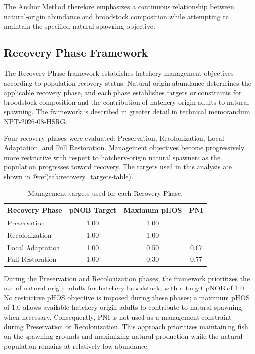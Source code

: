\documentclass[12pt,letterpaper]{article}
\begin{document}
The Anchor Method therefore emphasizes a continuous relationship between
natural-origin abundance and broodstock composition while attempting to
maintain the specified natural-spawning objective.

\subsection{Recovery Phase Framework}\label{recovery-phase-framework}

The Recovery Phase framework establishes hatchery management objectives
according to population recovery status. Natural-origin abundance determines
the applicable recovery phase, and each phase establishes targets or
constraints for broodstock composition and the contribution of hatchery-origin
adults to natural spawning. The framework is described in greater detail in
technical memorandum NPT-2026-08-HSRG.

Four recovery phases were evaluated: Preservation, Recolonization, Local
Adaptation, and Full Restoration. Management objectives become progressively
more restrictive with respect to hatchery-origin natural spawners as the
population progresses toward recovery. The targets used in this analysis are shown in @ref(tab:recovery\_targets-table).

\begin{table}

\caption{\label{tab:recovery-targets-table}Management targets used for each Recovery Phase.}
\centering
\begin{tabular}[t]{l|c|c|c}
\hline
Recovery Phase & pNOB Target & Maximum pHOS & PNI\\
\hline
Preservation & 1.00 & 1.00 & --\\
\hline
Recolonization & 1.00 & 1.00 & --\\
\hline
Local Adaptation & 1.00 & 0.50 & 0.67\\
\hline
Full Restoration & 1.00 & 0.30 & 0.77\\
\hline
\end{tabular}
\end{table}

During the Preservation and Recolonization phases, the framework prioritizes
the use of natural-origin adults for hatchery broodstock, with a target pNOB
of 1.0. No restrictive pHOS objective is imposed during these phases; a maximum
pHOS of 1.0 allows available hatchery-origin adults to contribute to natural
spawning when necessary. Consequently, PNI is not used as a management
constraint during Preservation or Recolonization. This approach prioritizes
maintaining fish on the spawning grounds and maximizing natural production
while the natural population remains at relatively low abundance.
\end{document}
